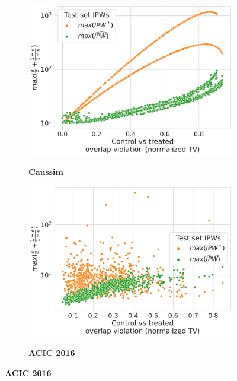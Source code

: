 \documentclass[unnumsec,webpdf,contemporary,large]{oup-authoring-template}%
\theoremstyle{thmstyleone}%
\theoremstyle{thmstyletwo}%
\theoremstyle{thmstylethree}%
\begin{document}
\begin{appendices}
    \begin{figure}[ht]
        \centering
        \begin{subfigure}[b]{0.47\textwidth}
            \centering
            \caption{\textbf{Caussim}}
            \includegraphics[width=\textwidth]{overlap_measure_caussim_max_ipw_vs_ntv.pdf}
            \label{apd:caussim:max_ipw_vs_ntv}
        \end{subfigure}
        \hfill
        \begin{subfigure}[b]{0.47\textwidth}
            \centering
            \caption{\textbf{ACIC 2016}}
            \includegraphics[width=\textwidth]{overlap_measure_acic_2016_max_ipw_vs_ntv.pdf}
            \label{apd:acic_2016:ntv_vs_max_ipw}
        \end{subfigure}

\end{figure}
\end{appendices}
\end{document}
